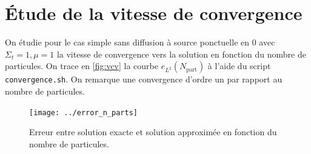 \documentclass[11pt,a4paper]{article}
\begin{document}
\section{Étude de la vitesse de convergence}

On étudie pour le cas simple sans diffusion à source ponctuelle en $0$ avec $\Sigma_t=1, \mu=1$ la vitesse de convergence vers la solution en fonction du nombre de particules. On trace en \autoref{fig:vcv} la courbe $e_{L^2}(N_{\text{part}})$ à l'aide du script \texttt{convergence.sh}. On remarque une convergence d'ordre un par rapport au nombre de particules.   

\begin{figure}
  \centering
  \texttt{[image: ../error\_n\_parts]}
  \caption{Erreur entre solution exacte et solution approximée en fonction du nombre de particules.}
  \label{fig:vcv}
\end{figure}
\end{document}
